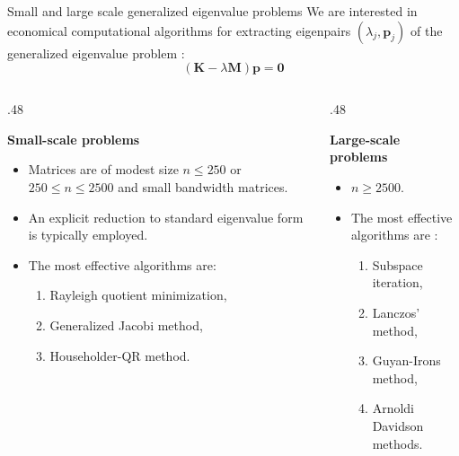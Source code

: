 \documentclass[aspectratio=169]{beamer}
\begin{document}
\begin{frame}{Small and large scale generalized eigenvalue problems}
  \small We are interested in economical computational algorithms for extracting eigenpairs $(\lambda_j,\mathbf p_j)$ of the generalized eigenvalue problem :
  $$(\mathbf K - \lambda \mathbf{M})\mathbf p=\mathbf 0$$
  \vspace{-0.8cm}
  \begin{columns}[T,onlytextwidth]
    \begin{column}{.48\textwidth}
      \begin{block}{}
        \textbf{\centering Small-scale problems}
        \begin{itemize}
          \item Matrices are of modest size $n\leq 250$ or $250\leq n \leq 2500$ and small bandwidth matrices.
          \item An explicit reduction to standard eigenvalue form is typically employed.
          \item The most effective algorithms are:
                \begin{enumerate}
                  \item Rayleigh quotient minimization,
                  \item Generalized Jacobi method,
                  \item Householder-QR method.
                \end{enumerate}
        \end{itemize}
      \end{block}
    \end{column}
    \begin{column}{.48\textwidth}
      \begin{block}{}
        \textbf{Large-scale problems}
        \begin{itemize}
          \item $n\geq 2500$.
          \item The most effective algorithms are :
                \begin{enumerate}
                  \item Subspace iteration,
                  \item Lanczos' method,
                  \item Guyan-Irons method,
                  \item Arnoldi Davidson methods.
                \end{enumerate}
        \end{itemize}
      \end{block}
    \end{column}
  \end{columns}
\end{frame}
\end{document}
